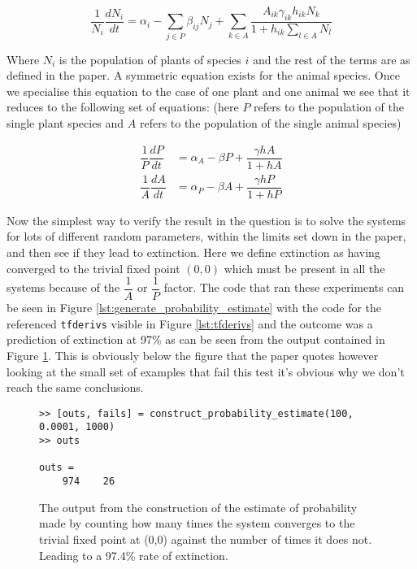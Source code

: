 \documentclass[11pt]{scrreprt}
\begin{document}
\begin{enumerate}
		$$
		\dfrac{1}{N_i} \dfrac{dN_i}{dt} = \alpha_i - \sum_{j \in P} \beta_{ij}N_j + \sum_{k \in A} \dfrac{A_{ik}\gamma_{ik}h_{ik}N_{k}}{1 + h_{ik}\sum_{l \in A}N_l}
		$$
		
		Where $N_i$ is the population of plants of species $i$ and the rest of the terms are as defined in the paper. A symmetric equation exists for the animal species. Once we specialise this equation to the case of one plant and one animal we see that it reduces to the following set of equations: (here $P$ refers to the population of the single plant species and $A$ refers to the population of the single animal species)
		
		\begin{align*}
		\dfrac{1}{P}\dfrac{dP}{dt} & = \alpha_{A} - \beta P + \dfrac{\gamma hA}{1 + hA} \\
		\dfrac{1}{A}\dfrac{dA}{dt} & = \alpha_{P} - \beta A + \dfrac{\gamma hP}{1 + hP} 
		\end{align*}
		
		Now the simplest way to verify the result in the question is to solve the systems for lots of different random parameters, within the limits set down in the paper, and then see if they lead to extinction. Here we define extinction as having converged to the trivial fixed point $(0,0)$ which must be present in all the systems because of the $\dfrac{1}{A}$ or $\dfrac{1}{P}$ factor. The code that ran these experiments can be seen in Figure \ref{lst:generate_probability_estimate} with the code for the referenced \texttt{tfderivs} visible in Figure \ref{lst:tfderivs} and the outcome was a prediction of extinction at 97\% as can be seen from the output contained in Figure \ref{fig:estimate_probability}. This is obviously below the figure that the paper quotes however looking at the small set of examples that fail this test it's obvious why we don't reach the same conclusions.
		
		\begin{figure}[ht]
			\begin{framed}
				\begin{verbatim}
>> [outs, fails] = construct_probability_estimate(100, 0.0001, 1000)
>> outs
				
outs =
	974    26
				\end{verbatim}
			\end{framed}
			\caption{The output from the construction of the estimate of probability made by counting how many times the system converges to the trivial fixed point at (0,0) against the number of times it does not. Leading to a 97.4\% rate of extinction.}
			\label{fig:estimate_probability}
		\end{figure}
		

\end{enumerate}
\end{document}
